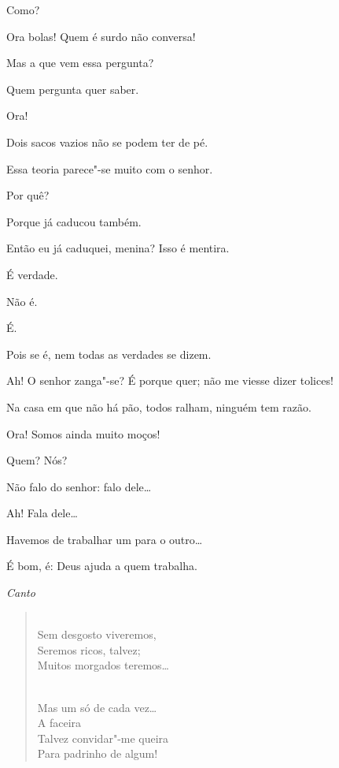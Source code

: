   Como?

  Ora bolas! Quem é surdo não conversa!

  Mas a que vem essa pergunta?

   Quem pergunta quer saber.

  Ora!

   Dois sacos vazios não se podem ter de pé.

  Essa teoria parece"-se muito com o senhor.

  Por quê?

  Porque já caducou também.

   Então eu já caduquei, menina?  Isso é
mentira.

  É verdade.

  Não é.

  É.

  Pois se é, nem todas as verdades se dizem.  

  Ah! O senhor zanga"-se? É porque quer; não me viesse dizer tolices!

  Na casa em
que não há pão, todos ralham, ninguém tem razão.

  Ora! Somos ainda muito moços!

  Quem? Nós?

   Não falo do senhor: falo dele\ldots

  Ah! Fala dele\ldots

  Havemos de trabalhar um para o outro\ldots

  É bom, é: Deus ajuda a quem trabalha.

{\smallskip\raggedleft\itshape Canto\par}
\begin{verse}
\\
Sem desgosto viveremos,\\
Seremos ricos, talvez;\\
Muitos morgados teremos\ldots

{}\\
Mas um só de cada vez\ldots\\
 A faceira\\
Talvez convidar"-me queira\\
Para padrinho de algum!
\end{verse}

